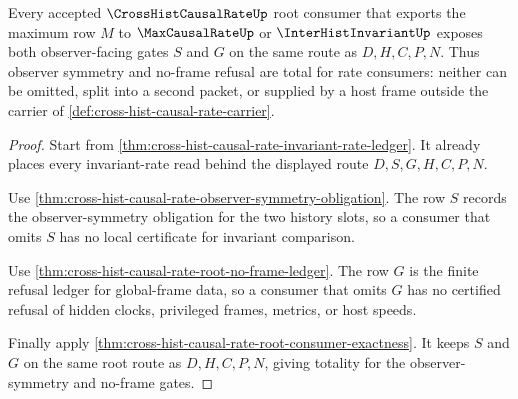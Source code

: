 \begin{theorem}
\label{thm:cross-hist-causal-rate-observer-symmetry-totality}
Every accepted $\CrossHistCausalRateUp$ root consumer that exports the maximum row $M$ to $\MaxCausalRateUp$ or $\InterHistInvariantUp$ exposes both observer-facing gates $S$ and $G$ on the same route as $D,H,C,P,N$. Thus observer symmetry and no-frame refusal are total for rate consumers: neither can be omitted, split into a second packet, or supplied by a host frame outside the carrier of \autoref{def:cross-hist-causal-rate-carrier}.
\end{theorem}
\begin{proof}
Start from \autoref{thm:cross-hist-causal-rate-invariant-rate-ledger}. It already places every invariant-rate read behind the displayed route $D,S,G,H,C,P,N$.

Use \autoref{thm:cross-hist-causal-rate-observer-symmetry-obligation}. The row $S$ records the observer-symmetry obligation for the two history slots, so a consumer that omits $S$ has no local certificate for invariant comparison.

Use \autoref{thm:cross-hist-causal-rate-root-no-frame-ledger}. The row $G$ is the finite refusal ledger for global-frame data, so a consumer that omits $G$ has no certified refusal of hidden clocks, privileged frames, metrics, or host speeds.

Finally apply \autoref{thm:cross-hist-causal-rate-root-consumer-exactness}. It keeps $S$ and $G$ on the same root route as $D,H,C,P,N$, giving totality for the observer-symmetry and no-frame gates.
\end{proof}

